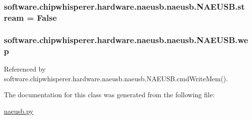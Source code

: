 \subsubsection[{stream}]{\setlength{\rightskip}{0pt plus 5cm}software.\+chipwhisperer.\+hardware.\+naeusb.\+naeusb.\+N\+A\+E\+U\+S\+B.\+stream = False\hspace{0.3cm}{\ttfamily [static]}}\label{classsoftware_1_1chipwhisperer_1_1hardware_1_1naeusb_1_1naeusb_1_1NAEUSB_ab0bf21f14a983026411fb9bafee6dd91}
\hypertarget{classsoftware_1_1chipwhisperer_1_1hardware_1_1naeusb_1_1naeusb_1_1NAEUSB_a7eaef2c29dc956759f4911d6e8001375}{}
\subsubsection[{wep}]{\setlength{\rightskip}{0pt plus 5cm}software.\+chipwhisperer.\+hardware.\+naeusb.\+naeusb.\+N\+A\+E\+U\+S\+B.\+wep}\label{classsoftware_1_1chipwhisperer_1_1hardware_1_1naeusb_1_1naeusb_1_1NAEUSB_a7eaef2c29dc956759f4911d6e8001375}


Referenced by software.\+chipwhisperer.\+hardware.\+naeusb.\+naeusb.\+N\+A\+E\+U\+S\+B.\+cmd\+Write\+Mem().



The documentation for this class was generated from the following file\+:\begin{DoxyCompactItemize}
\item 
\hyperlink{naeusb_8py}{naeusb.\+py}\end{DoxyCompactItemize}
